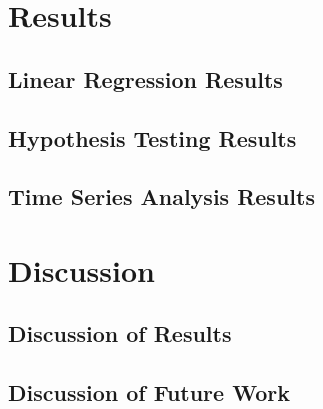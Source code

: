 \documentclass[11pt]{article}
\begin{document}
		
		
\section{Results}
		
	\subsection{Linear Regression Results}
	
		
		
		
	\subsection{Hypothesis Testing Results}
	
		
		
	\subsection{Time Series Analysis Results}
	
		
		
\section{Discussion}
	
	\subsection{Discussion of Results}
		
		
		
	\subsection{Discussion of Future Work}
	
		
		


\end{document}
